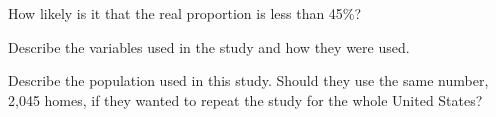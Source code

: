 \begin{problem}
\begin{subproblem}
      \vfill

    \item How likely is it that the real proportion is less than 45\%?

      \vfill

    \item Describe the variables used in the study and how they were
      used. 

      \vfill

    \item Describe the population used in this study. Should they use
      the same number, 2,045 homes, if they wanted to repeat the study
      for the whole United States?

      \vfill

    \end{subproblem}

\end{problem}
